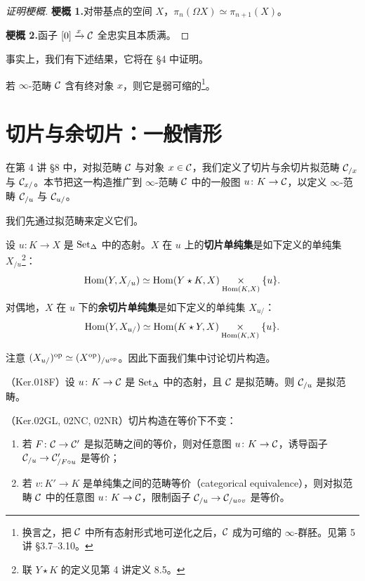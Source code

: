 \begin{proof}[证明梗概]
\textbf{梗概 1.}\quad 对带基点的空间 $X$，$\pi_n(\Omega X)\simeq\pi_{n+1}(X)$。

\textbf{梗概 2.}\quad 函子 $[0]\xrightarrow{x}\mathcal{C}$ 全忠实且本质满。
\end{proof}

\nitem\label{L6-2.11} 事实上，我们有下述结果，它将在 §4 中证明。

\begin{proposition}\label{L6-2.12}
若 $\infty$-范畴 $\mathcal{C}$ 含有终对象 $x$，则它是弱可缩的\footnote{换言之，把 $\mathcal{C}$ 中所有态射形式地可逆化之后，$\mathcal{C}$ 成为可缩的 $\infty$-群胚。见第 5 讲 §3.7--3.10。}。
\end{proposition}

\section{切片与余切片：一般情形}

\nitem\label{L6-3.1} 在第 4 讲 §8 中，对拟范畴 $\mathcal{C}$ 与对象 $x\in\mathcal{C}$，我们定义了切片与余切片拟范畴 $\mathcal{C}_{/x}$ 与 $\mathcal{C}_{x/}$。本节把这一构造推广到 $\infty$-范畴 $\mathcal{C}$ 中的一般图 $u\colon K\to\mathcal{C}$，以定义 $\infty$-范畴 $\mathcal{C}_{/u}$ 与 $\mathcal{C}_{u/}$。

\nitem\label{L6-3.2} 我们先通过拟范畴来定义它们。

\begin{definition}\label{L6-3.3}
设 $u\colon K\to X$ 是 $\operatorname{Set}_\Delta$ 中的态射。$X$ 在 $u$ 上的\textbf{切片单纯集}是如下定义的单纯集 $X_{/u}$\footnote{联 $Y\star K$ 的定义见第 4 讲定义 8.5。}：
\[
\operatorname{Hom}(Y,X_{/u})\simeq\operatorname{Hom}(Y\star K,X)\underset{\operatorname{Hom}(K,X)}{\times}\{u\}.
\]
对偶地，$X$ 在 $u$ 下的\textbf{余切片单纯集}是如下定义的单纯集 $X_{u/}$：
\[
\operatorname{Hom}(Y,X_{u/})\simeq\operatorname{Hom}(K\star Y,X)\underset{\operatorname{Hom}(K,X)}{\times}\{u\}.
\]
\end{definition}

\nitem\label{L6-3.4} 注意 $(X_{u/})^{\mathrm{op}}\simeq (X^{\mathrm{op}})_{/u^{\mathrm{op}}}$。因此下面我们集中讨论切片构造。

\begin{proposition}\label{L6-3.5}
（Ker.018F）设 $u\colon K\to\mathcal{C}$ 是 $\operatorname{Set}_\Delta$ 中的态射，且 $\mathcal{C}$ 是拟范畴。则 $\mathcal{C}_{/u}$ 是拟范畴。
\end{proposition}

\begin{proposition}\label{L6-3.6}
（Ker.02GL, 02NC, 02NR）切片构造在等价下不变：
\begin{enumerate}[label=(\arabic*),leftmargin=2.4em,itemsep=0.1em]
\item 若 $F\colon\mathcal{C}\to\mathcal{C}'$ 是拟范畴之间的等价，则对任意图 $u\colon K\to\mathcal{C}$，诱导函子 $\mathcal{C}_{/u}\to\mathcal{C}'_{/F\circ u}$ 是等价；
\item 若 $v\colon K'\to K$ 是单纯集之间的范畴等价（categorical equivalence），则对拟范畴 $\mathcal{C}$ 中的任意图 $u\colon K\to\mathcal{C}$，限制函子 $\mathcal{C}_{/u}\to\mathcal{C}_{/u\circ v}$ 是等价。
\end{enumerate}
\end{proposition}

